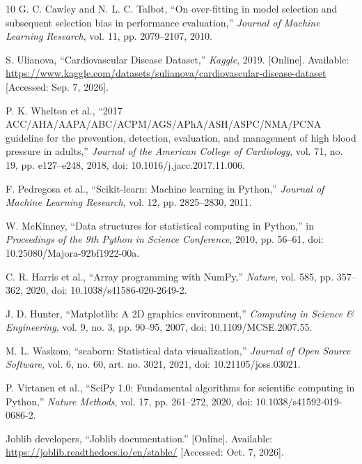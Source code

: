 \documentclass[11pt,a4paper]{article}
\begin{document}
\begin{thebibliography}{10}
G. C. Cawley and N. L. C. Talbot,
``On over-fitting in model selection and subsequent selection bias in performance evaluation,''
\textit{Journal of Machine Learning Research}, vol. 11, pp. 2079--2107, 2010.

S. Ulianova,
``Cardiovascular Disease Dataset,''
\textit{Kaggle}, 2019.
[Online]. Available:
\url{https://www.kaggle.com/datasets/sulianova/cardiovascular-disease-dataset}
[Accessed: Sep. 7, 2026].

P. K. Whelton et al.,
``2017 ACC/\allowbreak AHA/\allowbreak AAPA/\allowbreak ABC/\allowbreak ACPM/\allowbreak AGS/\allowbreak APhA/\allowbreak ASH/\allowbreak ASPC/\allowbreak NMA/\allowbreak PCNA guideline for the prevention, detection, evaluation, and management of high blood pressure in adults,''
\textit{Journal of the American College of Cardiology},
vol. 71, no. 19, pp. e127--e248, 2018,
doi: 10.1016/j.jacc.2017.11.006.

F. Pedregosa et al.,
``Scikit-learn: Machine learning in Python,''
\textit{Journal of Machine Learning Research},
vol. 12, pp. 2825--2830, 2011.

W. McKinney,
``Data structures for statistical computing in Python,''
in \textit{Proceedings of the 9th Python in Science Conference},
2010, pp. 56--61,
doi: 10.25080/Majora-92bf1922-00a.

C. R. Harris et al.,
``Array programming with NumPy,''
\textit{Nature}, vol. 585, pp. 357--362, 2020,
doi: 10.1038/s41586-020-2649-2.

J. D. Hunter,
``Matplotlib: A 2D graphics environment,''
\textit{Computing in Science \& Engineering},
vol. 9, no. 3, pp. 90--95, 2007,
doi: 10.1109/MCSE.2007.55.

M. L. Waskom,
``seaborn: Statistical data visualization,''
\textit{Journal of Open Source Software},
vol. 6, no. 60, art. no. 3021, 2021,
doi: 10.21105/joss.03021.

P. Virtanen et al.,
``SciPy 1.0: Fundamental algorithms for scientific computing in Python,''
\textit{Nature Methods}, vol. 17, pp. 261--272, 2020,
doi: 10.1038/s41592-019-0686-2.

Joblib developers,
``Joblib documentation.''
[Online]. Available:
\url{https://joblib.readthedocs.io/en/stable/}
[Accessed: Oct. 7, 2026].

\end{thebibliography}
\end{document}
